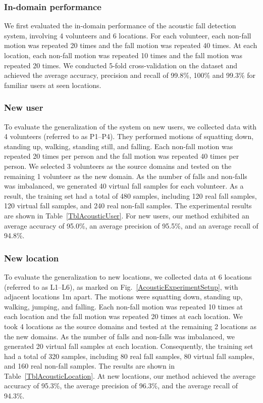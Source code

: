 \documentclass[journal]{IEEEtran}
\begin{document}
\subsubsection{In-domain performance}
We first evaluated the in-domain performance of the acoustic fall detection system, involving 4 volunteers and 6 locations. For each volunteer, each non-fall motion was repeated 20 times and the fall motion was repeated 40 times. At each location, each non-fall motion was repeated 10 times and the fall motion was repeated 20 times. We conducted 5-fold cross-validation on the dataset and achieved the average accuracy, precision and recall of 99.8\%, 100\% and 99.3\% for familiar users at seen locations.

\subsubsection{New user}
To evaluate the generalization of the system on new users, we collected data with 4 volunteers (referred to as P1--P4). They performed motions of squatting down, standing up, walking, standing still, and falling. Each non-fall motion was repeated 20 times per person and the fall motion was repeated 40 times per person. We selected 3 volunteers as the source domains and tested on the remaining 1 volunteer as the new domain. As the number of falls and non-falls was imbalanced, we generated 40 virtual fall samples for each volunteer. As a result, the training set had a total of 480 samples, including 120 real fall samples, 120 virtual fall samples, and 240 real non-fall samples. 
The experimental results are shown in Table~\ref{TblAcousticUser}. For new users, our method exhibited an average accuracy of 95.0\%, an average precision of 95.5\%, and an average recall of 94.8\%. 

\subsubsection{New location}
To evaluate the generalization to new locations, we collected data at 6 locations (referred to as L1--L6), as marked on Fig.~\ref{AcousticExperimentSetup}, with adjacent locations 1m apart. The motions were squatting down, standing up, walking, jumping, and falling. Each non-fall motion was repeated 10 times at each location and the fall motion was repeated 20 times at each location. We took 4 locations as the source domains and tested at the remaining 2 locations as the new domains. As the number of falls and non-falls was imbalanced, we generated 20 virtual fall samples at each location. Consequently, the training set had a total of 320 samples, including 80 real fall samples, 80 virtual fall samples, and 160 real non-fall samples. 
The results are shown in Table~\ref{TblAcousticLocation}. At new locations, our method achieved the average accuracy of 95.3\%, the average precision of 96.3\%, and the average recall of 94.3\%. 
\end{document}
